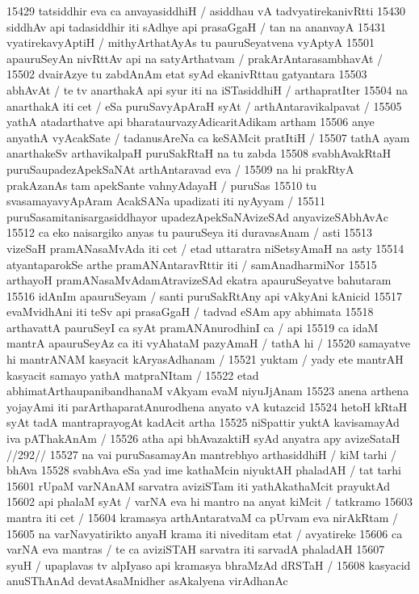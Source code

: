 15429 tatsiddhir eva ca anvayasiddhiH / asiddhau vA tadvyatirekanivRtti
15430 siddhAv api tadasiddhir iti sAdhye api prasaGgaH / tan na  ananvayA
15431 vyatirekavyAptiH / mithyArthatAyAs tu pauruSeyatvena vyAptyA  
15501 apauruSeyAn nivRttAv api na satyArthatvam / prakArAntarasambhavAt /
15502 dvairAzye tu zabdAnAm etat syAd ekanivRttau gatyantara 
15503 abhAvAt / te tv anarthakA api syur iti na iSTasiddhiH /  arthapratIter
15504 na anarthakA iti cet / eSa puruSavyApAraH syAt / arthAntaravikalpavat /
15505 yathA atadarthatve api bharataurvazyAdicaritAdikam artham  
15506 anye anyathA vyAcakSate / tadanusAreNa ca keSAMcit pratItiH / 
15507 tathA ayam anarthakeSv arthavikalpaH puruSakRtaH na tu zabda 
15508 svabhAvakRtaH puruSaupadezApekSaNAt arthAntaravad eva / 
15509 na hi prakRtyA prakAzanAs tam apekSante vahnyAdayaH / puruSas  
15510 tu svasamayavyApAram AcakSANa upadizati iti nyAyyam /  
15511 puruSasamitanisargasiddhayor upadezApekSaNAvizeSAd anyavizeSAbhAvAc
15512 ca eko naisargiko anyas tu pauruSeya iti duravasAnam / asti  
15513 vizeSaH pramANasaMvAda iti cet / etad uttaratra niSetsyAmaH na asty
15514 atyantaparokSe arthe pramANAntaravRttir iti / samAnadharmiNor 
15515 arthayoH pramANasaMvAdamAtravizeSAd ekatra apauruSeyatve bahutaram 
15516 idAnIm apauruSeyam / santi puruSakRtAny api vAkyAni kAnicid  
15517 evaMvidhAni iti teSv api prasaGgaH / tadvad eSAm apy abhimata 
15518 arthavattA pauruSeyI ca syAt pramANAnurodhinI ca / api 
15519 ca idaM mantrA apauruSeyAz ca iti vyAhataM pazyAmaH / tathA hi /  
15520 	samayatve hi mantrANAM kasyacit kAryasAdhanam /  
15521 	yuktam / yady ete mantrAH kasyacit samayo yathA matpraNItam / 
15522 etad abhimatArthaupanibandhanaM vAkyam evaM niyuJjAnam
15523 anena arthena yojayAmi iti parArthaparatAnurodhena anyato vA kutazcid
15524 hetoH kRtaH syAt tadA mantraprayogAt kadAcit artha
15525 niSpattir yuktA kavisamayAd iva pAThakAnAm /
15526 	atha api bhAvazaktiH syAd anyatra apy avizeSataH //292// 
15527 na vai puruSasamayAn mantrebhyo arthasiddhiH / kiM tarhi / bhAva  
15528 svabhAva eSa yad ime kathaMcin niyuktAH phaladAH / tat tarhi  
15601 rUpaM varNAnAM sarvatra aviziSTam iti yathAkathaMcit prayuktAd 
15602 api phalaM syAt / varNA eva hi mantro na anyat kiMcit / tatkramo
15603 mantra iti cet / 
15604 	kramasya arthAntaratvaM ca pUrvam eva nirAkRtam /  
15605 na varNavyatirikto anyaH krama iti niveditam etat / avyatireke  
15606 ca varNA eva mantras / te ca aviziSTAH sarvatra iti sarvadA phaladAH  
15607 syuH / upaplavas tv alpIyaso api kramasya bhraMzAd dRSTaH / 
15608 kasyacid anuSThAnAd devatAsaMnidher asAkalyena virAdhanAc 
